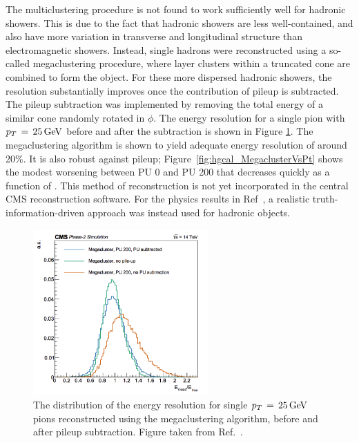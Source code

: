 The multiclustering procedure is not found to work sufficiently well for hadronic showers.
This is due to the fact that hadronic showers are less well-contained, and also have more variation in transverse and longitudinal structure than electromagnetic showers.
Instead, single hadrons were reconstructed using a so-called megaclustering procedure, where layer clusters within a truncated cone are combined to form the object. 
For these more dispersed hadronic showers, the resolution substantially improves once the contribution of pileup is subtracted.
The pileup subtraction was implemented by removing the total energy of a similar cone randomly rotated in $\phi$. 
The energy resolution for a single pion with $p_T\,=\,\SI{25}{GeV}$ before and after the subtraction is shown in Figure \ref{fig:hgcal_SingleMegacluster}. 
The megaclustering algorithm is shown to yield adequate energy resolution of around 20\%. 
It is also robust against pileup; Figure~\ref{fig:hgcal_MegaclusterVsPt} shows the modest worsening between PU 0 and PU 200 that decreases quickly as a function of \pt.
This method of reconstruction is not yet incorporated in the central CMS reconstruction software.
For the physics results in Ref~\cite{HGCAL}, a realistic truth-information-driven approach was instead used for hadronic objects.

\begin{figure}[h!]
  \centering
  \includegraphics[width=0.6\textwidth]{Figures/HGCAL/SingleMegacluster.png}
  \caption[HGCAL pion energy response.]
  {
    The distribution of the energy resolution for single $p_T\,=\,\SI{25}{GeV}$ pions 
    reconstructed using the megaclustering algorithm, 
    before and after pileup subtraction. 
    Figure taken from Ref.~\cite{HGCAL}.
  }
  \label{fig:hgcal_SingleMegacluster}
\end{figure}

